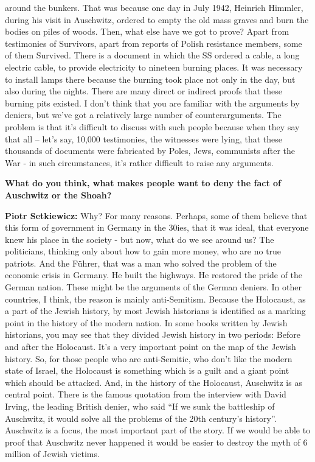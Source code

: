 around the bunkers. That was because one day in July 1942, Heinrich Himmler, during his visit in Auschwitz, ordered to empty the old mass graves and burn the bodies on piles of woods. 
Then, what else have we got to prove? Apart from testimonies of Survivors, apart from reports of Polish resistance members, some of them Survived. There is a document in which the SS ordered a cable, a long electric cable, to provide electricity to nineteen burning places. It was necessary to install lamps there because the burning took place not only in the day, but also during the nights. There are many direct or indirect proofs that these burning pits existed. I don’t think that you are familiar with the arguments by deniers, but we’ve got a relatively large number of counterarguments. The problem is that it’s difficult to discuss with such people because when they say that all – let’s say, 10,000 testimonies, the witnesses were lying, that these thousands of documents were fabricated by Poles, Jews, communists after the War - in such circumstances, it’s rather difficult to raise any arguments.

\textbf{What do you think, what makes people want to deny the fact of Auschwitz or the Shoah?}

\textbf{Piotr Setkiewicz:} Why? For many reasons. Perhaps, some of them believe that this form of government in Germany in the 30ies, that it was ideal, that everyone knew his place in the society - but now, what do we see around us? The politicians, thinking only about how to gain more money, who are no true patriots. And the Führer, that was a man who solved the problem of the economic crisis in Germany. He built the highways. He restored the pride of the German nation. These might be the arguments of the German deniers. In other countries, I think, the reason is mainly anti-Semitism. Because the Holocaust, as a part of the Jewish history, by most Jewish historians is identified as a marking point in the history of the modern nation. In some books written by Jewish historians, you may see that they divided Jewish history in two periods: Before and after the Holocaust. It’s a very important point on the map of the Jewish history. So, for those people who are anti-Semitic, who don’t like the modern state of Israel, the Holocaust is something which is a guilt and a giant point which should be attacked. And, in the history of the Holocaust, Auschwitz is as central point. There is the famous quotation from the interview with David Irving, the leading British denier, who said ``If we sunk the battleship of Auschwitz, it would solve all the problems of the 20th century’s history''. Auschwitz is a focus, the most important part of the story. If we would be able to proof that Auschwitz never happened it would be easier to destroy the myth of 6 million of Jewish victims.

